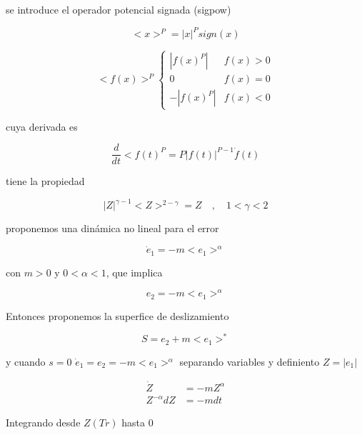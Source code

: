 se introduce el operador potencial signada (sigpow)

\begin{equation*}
    <x>^P=|x|^P sign(x)
\end{equation*}

\begin{equation*}
    <f(x)>^P \begin{cases}
        |f(x)^P| & f(x)>0\\
        0 & f(x)=0\\
        -|f(x)^P| & f(x)<0
    \end{cases}
\end{equation*}

cuya derivada es

\begin{equation*}
    \frac{d}{dt}<f(t)^P=P|f(t)|^{P-1}\dot{f}(t)
\end{equation*}

tiene la propiedad

\begin{equation*}
    |Z|^{\gamma-1}<Z>^{2-\gamma}=Z \quad , \quad 1<\gamma<2
\end{equation*}

proponemos una dinámica no lineal para el error

\begin{equation*}
    \dot{e}_1=-m<e_1>^\alpha
\end{equation*}

con $m>0$ y $0<\alpha<1$, que implica

\begin{equation*}
    e_2=-m<e_1>^\alpha
\end{equation*}

Entonces proponemos la superfice de deslizamiento

\begin{equation*}
    S=e_2+m<e_1>^*
\end{equation*}

y cuando $s=0$ $\dot{e}_1=e_2=-m<e_1>^\alpha$ separando variables y definiento $Z=|e_1|$

\begin{equation*}
    \begin{aligned}
        \dot{Z}&=-mZ^\alpha\\
        Z^{-\alpha}dZ&=-mdt
    \end{aligned}
\end{equation*}


Integrando desde $Z(Tr)$ hasta $0$

